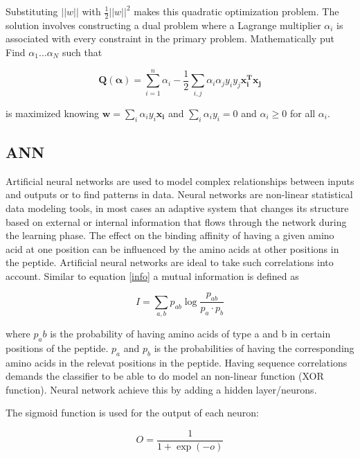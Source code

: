 Substituting $||w||$ with $\frac{1}{2}||w||^2$ makes this quadratic optimization problem. 
The solution involves constructing a dual problem where 
a Lagrange multiplier $\alpha_i$ 
is associated with every 
constraint in the primary problem. Mathematically put Find $\alpha_1…\alpha_N$
such that

\begin{equation}
\mathbf{Q(\alpha)} = \sum_{i=1}^{n}{\alpha_i} - \frac{1}{2}\sum_{i,j}{\alpha_i\alpha_j y_i y_j \mathbf{x_i^T x_j} }
\end{equation}

is maximized knowing $\mathbf{w} = \sum_{i}{ \alpha_i y_i \mathbf{x_i} }$ and $\sum_{i}{\alpha_i y_i} = 0$ and $\alpha_i \geq 0$ for all $\alpha_i$.

\subsection*{ANN}
Artificial neural networks are used to model complex relationships between inputs and outputs or to find patterns in data.
Neural networks are non-linear statistical data modeling tools, in most cases an adaptive system that changes its structure based on external or internal information that flows through the network during the learning phase.
The effect on the binding affinity of
having a given amino acid at one
position can be influenced by the
amino acids at other positions in the
peptide. Artificial neural networks are
ideal to take such
correlations into account. Similar to equation \ref{info} a mutual information is defined as

\begin{equation}
\label{mutinfo}
I = \sum_{a,b}{ p_{ab}\log{ \frac{ p_{ab} }{ p_a \cdot p_b } } }
\end{equation}

where $p_ab$ is the probability of having amino acids of type a and b in certain positions of the peptide. $p_a$ and $p_b$ is the probabilities of having the corresponding amino acids in the relevat positions in the peptide.
Having sequence correlations demands the classifier to be able to do model an non-linear function (XOR function). Neural network achieve this by adding a hidden layer/neurons.

The sigmoid function is used for the output of each neuron:

\begin{equation}
O = \frac{1}{1+\exp{(-o)}}
\end{equation}

